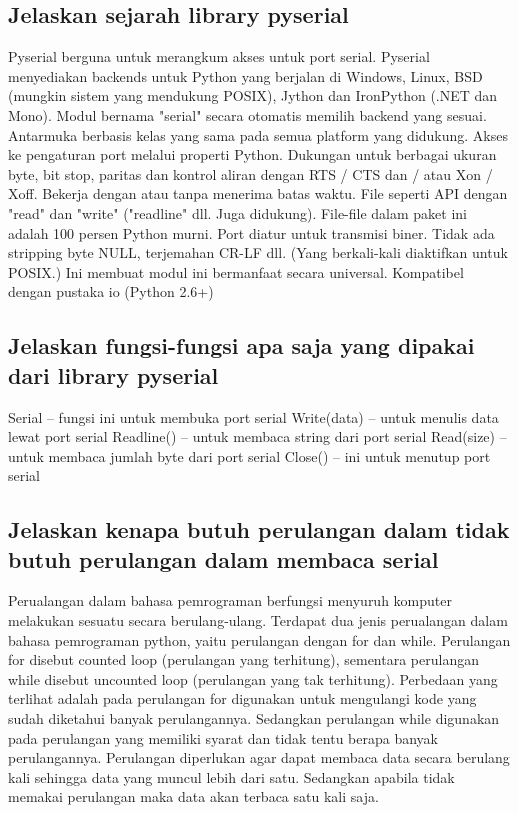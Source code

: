 \subsection{Jelaskan sejarah library pyserial}
Pyserial berguna untuk merangkum akses untuk port serial. Pyserial menyediakan backends untuk Python yang berjalan di Windows, Linux, BSD (mungkin sistem yang mendukung POSIX), Jython dan IronPython (.NET dan Mono). Modul bernama "serial" secara otomatis memilih backend yang sesuai. Antarmuka berbasis kelas yang sama pada semua platform yang didukung.
Akses ke pengaturan port melalui properti Python.
Dukungan untuk berbagai ukuran byte, bit stop, paritas dan kontrol aliran dengan RTS / CTS dan / atau Xon / Xoff.
Bekerja dengan atau tanpa menerima batas waktu.
File seperti API dengan "read" dan "write" ("readline" dll. Juga didukung).
File-file dalam paket ini adalah 100 persen Python murni.
Port diatur untuk transmisi biner. Tidak ada stripping byte NULL, terjemahan CR-LF dll. (Yang berkali-kali diaktifkan untuk POSIX.) Ini membuat modul ini bermanfaat secara universal.
Kompatibel dengan pustaka io (Python 2.6+)

\subsection{Jelaskan fungsi-fungsi apa saja yang dipakai dari library pyserial}
Serial – fungsi ini untuk membuka port serial
Write(data) – untuk menulis data lewat port serial
Readline() – untuk membaca string dari port serial
Read(size) – untuk membaca jumlah byte dari port serial
Close() – ini untuk menutup port serial 

\subsection{Jelaskan kenapa butuh perulangan dalam tidak butuh perulangan dalam membaca serial}
Perualangan dalam bahasa pemrograman berfungsi menyuruh komputer melakukan sesuatu secara berulang-ulang. Terdapat dua jenis perualangan dalam bahasa pemrograman python, yaitu perulangan dengan for dan while.
Perulangan for disebut counted loop (perulangan yang terhitung), sementara perulangan while disebut uncounted loop (perulangan yang tak terhitung). Perbedaan yang terlihat adalah pada perulangan for digunakan untuk mengulangi kode yang sudah diketahui banyak perulangannya. Sedangkan perulangan while digunakan pada perulangan yang memiliki syarat dan tidak tentu berapa banyak perulangannya.
Perulangan diperlukan agar dapat membaca data secara berulang kali sehingga data yang muncul lebih dari satu.  Sedangkan apabila tidak memakai perulangan maka data akan terbaca satu kali saja.

